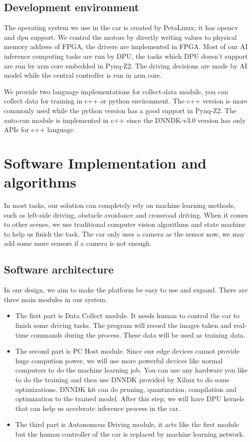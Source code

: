 \documentclass[conference]{IEEEtran}
\begin{document}
\subsection{Development environment}

The operating system we use in the car is created by PetaLinux\cite{b9}, it has opencv and dpu support. We control the motors by directly writing values to physical memory address of FPGA, the drivers are implemented in FPGA. Most of our AI inference computing tasks are run by DPU, the tasks which DPU doesn't support are run by arm core embedded in Pynq-Z2. The driving decisions are made by AI model while the central controller is run in arm core.  

We provide two language implementations for collect-data module, you can collect data for training in c++ or python environment. The c++ version is more commonly used while the python version has a good support in Pynq-Z2. The auto-run module is implemented in c++ since the DNNDK-v3.0\cite{b10} version has only APIs for c++ language.

\section{Software Implementation and algorithms}

In most tasks, our solution can completely rely on machine learning methods, such as left-side driving, obstacle avoidance and crossroad driving. When it comes to other scenes, we use traditional computer vision algorithms and state machine to help us finish the task. The car only uses a camera as the sensor now, we may add some more sensors if a camera is not enough.

\subsection{Software architecture}\label{AA}

In our design, we aim to make the platform be easy to use and expand. There are three main modules in our system.

\begin{itemize}
\item The first part is Data Collect module. It needs human to control the car to finish some driving tasks. The program will record the images taken and real-time commands during the process. These data will be used as training data.
\item The second part is PC Host module. Since our edge devices cannot provide huge compution power, we will use more powerful devices like normal computers to do the machine learning job. You can use any hardware you like to do the training and then use DNNDK provided by Xilinx to do some optimizations. DNNDK kit can do pruning, quantization, compilation and optimization to the trained model. After this step, we will have DPU kernels that can help us accelerate inference process in the car.
\item The third part is Autonomous Driving module, it acts like the first module but the human controller of the car is replaced by machine learning network.
\end{itemize}
\end{document}
